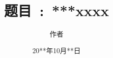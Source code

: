 
\subject{计算机科学与技术}
\author{作者}
\date{20**年10月**日}

\ifxueweidoctor
  \title{题目~:~***} %
\fi
\ifxueweimaster
  \title{xxxx}
\fi

\makecover
\clearpage
\setcounter{page}{1}
